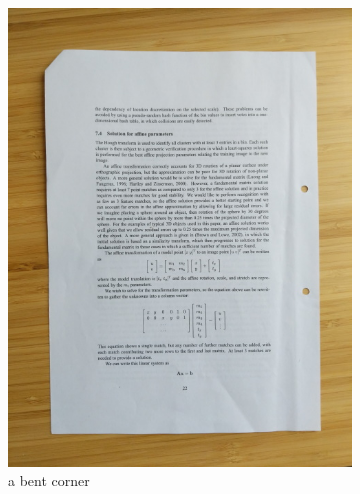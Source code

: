 \documentclass[bibliography=totoc]{scrartcl}
\begin{document}
\begin{figure}[H]
\begin{subfigure}[t]{0.3\linewidth}
		\includegraphics[width=\linewidth]{imgs/not_working/bent_corner.jpg}
		\caption{a bent corner}
		\label{subfig:bent_corner}
	\end{subfigure}
	\hspace{0.02\textwidth}
	\begin{subfigure}[t]{0.3\linewidth}

\end{subfigure}
\end{figure}
\end{document}
